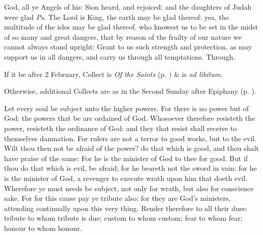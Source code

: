 \introit
{} God, all ye Angels of his: Sion heard, and rejoiced: and the daughters of Judah were glad \textit{Ps.} The Lord is King, the earth may be glad thereof: yea, the multitude of the isles may be glad thereof.
\collect
{} who knowest us to be set in the midst of so many and great dangers, that by reason of the frailty of our nature we cannot always stand upright; Grant to us such strength and protection, as may support us in all dangers, and carry us through all temptations. Through.
\begin{rubric}
    If it be after 2 February,  Collect is \emph{Of the Saints} (p. \pageref{SPSaints}) \&  is \emph{ad libitum}.\par
    Otherwise, additional Collects are as in the Second Sunday after Epiphany (p. \pageref{EpiphanyIICollect}).
\end{rubric}
 Let every soul be subject unto the higher powers. For there is no power but of God: the powers that be are ordained of God. Whosoever therefore resisteth the power, resisteth the ordinance of God: and they that resist shall receive to themselves damnation. For rulers are not a terror to good works, but to the evil. Wilt thou then not be afraid of the power? do that which is good, and thou shalt have praise of the same: For he is the minister of God to thee for good. But if thou do that which is evil, be afraid; for he beareth not the sword in vain: for he is the minister of God, a revenger to execute wrath upon him that doeth evil. Wherefore ye must needs be subject, not only for wrath, but also for conscience sake. For for this cause pay ye tribute also: for they are God's ministers, attending continually upon this very thing. Render therefore to all their dues: tribute to whom tribute is due; custom to whom custom; fear to whom fear; honour to whom honour.


